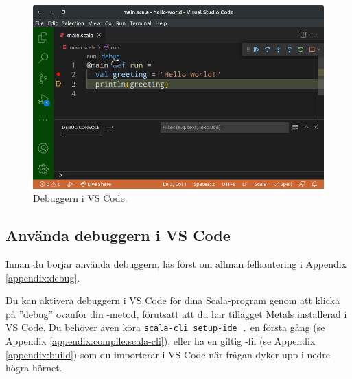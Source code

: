 \begin{figure}
\centering
\includegraphics[width=1.0\textwidth]{../img/vscode-debug}
\caption{Debuggern i VS Code.\label{appendix-ide:vscode-debug}}
\end{figure}

\subsection{Använda debuggern i VS Code}

Innan du börjar använda debuggern, läs först om allmän felhantering i Appendix \ref{appendix:debug}.

Du kan aktivera debuggern i VS Code för dina Scala-program genom att klicka på ''debug'' ovanför din -metod, förutsatt att du har tillägget Metals installerad i VS Code. Du behöver även köra \texttt{scala-cli setup-ide .} en första gång (se Appendix \ref{appendix:compile:scala-cli}), eller ha en giltig -fil (se Appendix \ref{appendix:build}) som du importerar i VS Code när frågan dyker upp i nedre högra hörnet. 

